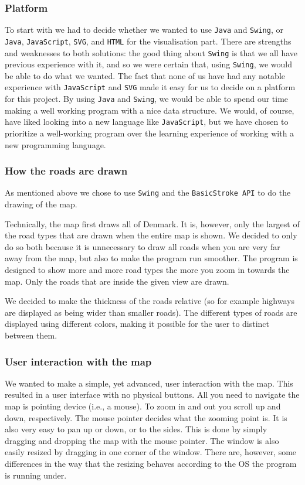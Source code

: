 \subsubsection{Platform}
To start with we had to decide whether we wanted to use \texttt{Java} and \texttt{Swing}, or \texttt{Java}, \texttt{JavaScript}, \texttt{SVG}, and \texttt{HTML} for the visualisation part. There are strengths and weaknesses to both solutions: the good thing about \texttt{Swing} is that we all have previous experience with it, and so we were certain that, using \texttt{Swing}, we would be able to do what we wanted. 
The fact that none of us have had any notable experience with \texttt{JavaScript} and \texttt{SVG} made it easy for us to decide on a platform for this project. By using \texttt{Java} and \texttt{Swing}, we would be able to spend our time making a well working program with a nice data structure. We would, of course, have liked looking into a new language like \texttt{JavaScript}, but we have chosen to prioritize a well-working program over the learning experience of working with a new programming language.

\subsubsection{How the roads are drawn}
As mentioned above we chose to use \texttt{Swing} and the \texttt{BasicStroke API} to do the drawing of the map. 

Technically, the map first draws all of Denmark. It is, however, only the largest of the road types that are drawn when the entire map is shown. We decided to only do so both because it is unnecessary to draw all roads when you are very far away from the map, but also to make the program run smoother. The program is designed to show more and more road types the more you zoom in towards the map. Only the roads that are inside the given view are drawn.

We decided to make the thickness of the roads relative (so for example highways are displayed as being wider than smaller roads). The different types of roads are displayed using different colors, making it possible for the user to distinct between them.

\subsubsection{User interaction with the map}
We wanted to make a simple, yet advanced, user interaction with the map. This resulted in a user interface with no physical buttons. All you need to navigate the map is pointing device (i.e., a mouse). To zoom in and out you scroll up and down, respectively. The mouse pointer decides what the zooming point is. It is also very easy to pan up or down, or to the sides. This is done by simply dragging and dropping the map with the mouse pointer. The window is also easily resized by dragging in one corner of the window. There are, however, some differences in the way that the resizing behaves according to the OS the program is running under.


